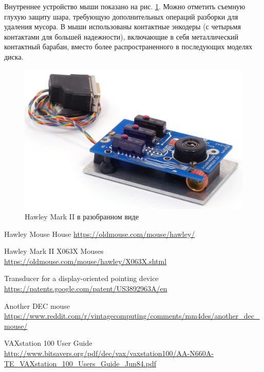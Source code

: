 \documentclass[11pt, a4paper]{article}
\begin{document}
Внутреннее устройство мыши показано на рис. \ref{fig:DecVS10XInside}. Можно отметить съемную глухую защиту шара, требующую дополнительных операций разборки для удаления мусора. В мыши использованы контактные энкодеры (с четырьмя контактами для большей надежности), включающие в себя металлический контактный барабан, вместо более распространенного в последующих моделях диска.

 \begin{figure}[h]
    \centering
    \includegraphics[scale=0.8]{1983_hawley_mark_ii/inside_60.jpg}
    \caption{Hawley Mark II в разобранном виде}
    \label{fig:DecVS10XInside}
\end{figure}

\begin{thebibliography}{9}
 Hawley Mouse House \url{https://oldmouse.com/mouse/hawley/}

 Hawley Mark II X063X Mouses \url{https://oldmouse.com/mouse/hawley/X063X.shtml}

 Transducer for a display-oriented pointing device \url{https://patents.google.com/patent/US3892963A/en}

 Another DEC mouse \url{https://www.reddit.com/r/vintagecomputing/comments/mm4des/another_dec_mouse/}

 VAXstation 100 User Guide \url{http://www.bitsavers.org/pdf/dec/vax/vaxstation100/AA-N660A-TE_VAXstation_100_Users_Guide_Jun84.pdf}
\end{thebibliography}
\end{document}
